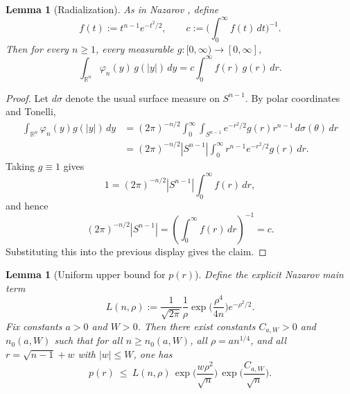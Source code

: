 \documentclass[11pt]{article}
\newtheorem{lemma}[theorem]{Lemma}
\begin{document}
\medskip

\begin{lemma}[Radialization]
 As in Nazarov \cite{Nazarov2003}, define
\begin{equation}\label{eq:f_c}
f(t):=t^{n-1}e^{-t^2/2},\qquad
c:=\Big(\int_0^\infty f(t)\,dt\Big)^{-1}.
\end{equation}
Then for every $n\geq 1$, every measurable $g:[0,\infty)\to[0,\infty]$,
\begin{equation}\label{eq:radialize}
\int_{\mathbb R^n}\varphi_n(y)\,g(|y|)\,dy
=
c\int_0^\infty f(r)\,g(r)\,dr.
\end{equation}
\end{lemma}
\begin{proof}
Let \(d\sigma\) denote the usual surface measure on \(S^{n-1}\). By polar coordinates and Tonelli,
\begin{align*}
\int_{\mathbb R^n}\varphi_n(y)g(|y|)\,dy
&=(2\pi)^{-n/2}\int_0^\infty\int_{S^{n-1}}
e^{-r^2/2}g(r)r^{n-1}\,d\sigma(\theta)\,dr \\
&=(2\pi)^{-n/2}|S^{n-1}|
\int_0^\infty r^{n-1}e^{-r^2/2}g(r)\,dr.
\end{align*}
Taking \(g\equiv 1\) gives
\[
1=(2\pi)^{-n/2}|S^{n-1}|\int_0^\infty f(r)\,dr,
\]
and hence
\[
(2\pi)^{-n/2}|S^{n-1}|=
\left(\int_0^\infty f(r)\,dr\right)^{-1}=c.
\]
Substituting this into the previous display gives the claim.
\end{proof}
\medskip


\begin{lemma}[Uniform upper bound for $p(r)$]\label{lem:p_bound}
Define the explicit Nazarov main term
\begin{equation}\label{eq:L_def}
L(n,\rho):=\frac{1}{\sqrt{2\pi}}\frac{1}{\rho}\exp\!\Big(\frac{\rho^4}{4n}\Big)e^{-\rho^2/2}.
\end{equation}
Fix constants $a>0$ and $W>0$. Then there exist constants $C_{a,W}>0$ and
$n_0(a,W)$ such that for all $n\ge n_0(a,W)$, all $\rho=a n^{1/4}$, and all
$r=\sqrt{n-1}+w$ with $|w|\le W$, one has
\begin{equation}\label{eq:p_bound}
p(r)\ \le\ L(n,\rho)\,\exp\!\Big(\frac{w\rho^2}{\sqrt{n}}\Big)\,
\exp\!\Big(\frac{C_{a,W}}{\sqrt{n}}\Big).
\end{equation}
\end{lemma}
\end{document}
